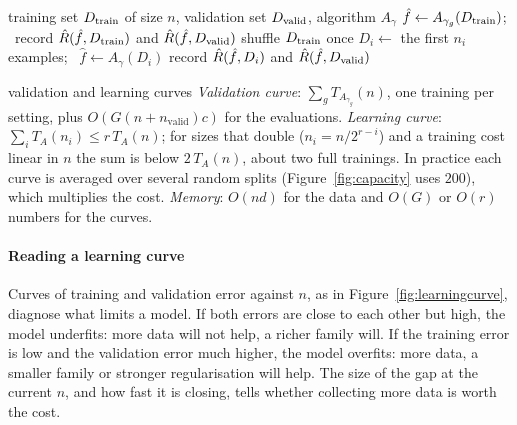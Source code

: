 \documentclass[11pt]{article}
\begin{document}
\begin{algorithm}[htbp]\small
\caption{Validation curve and learning curve}
\label{alg:curves}
\begin{algorithmic}[1]
\Require training set $D_{\mathrm{train}}$ of size $n$, validation set $D_{\mathrm{valid}}$, algorithm $A_\gamma$
    \State $\hat f \gets A_{\gamma_g}(D_{\mathrm{train}})$; \ record $\hat R(\hat f, D_{\mathrm{train}})$ and $\hat R(\hat f, D_{\mathrm{valid}})$
  \EndFor
\EndFunction
{}
  \State shuffle $D_{\mathrm{train}}$ once 
    \State $D_i \gets$ the first $n_i$ examples; \ $\hat f \gets A_\gamma(D_i)$
    \State record $\hat R(\hat f, D_i)$ and $\hat R(\hat f, D_{\mathrm{valid}})$
  \EndFor
\EndFunction
\end{algorithmic}
\end{algorithm}

\begin{runtime}{validation and learning curves}
\emph{Validation curve}: $\sum_g T_{A_{\gamma_g}}(n)$, one training per setting, plus $O(G(n + n_{\mathrm{valid}})c)$
for the evaluations. \emph{Learning curve}: $\sum_i T_A(n_i) \le r\,T_A(n)$; for sizes that double ($n_i = n/2^{r-i}$)
and a training cost linear in $n$ the sum is below $2\,T_A(n)$, about two full trainings. In practice each curve is
averaged over several random splits (Figure~\ref{fig:capacity} uses $200$), which multiplies the cost. \emph{Memory}:
$O(nd)$ for the data and $O(G)$ or $O(r)$ numbers for the curves.
\end{runtime}

\paragraph{Reading a learning curve} Curves of training and validation error against $n$, as in
Figure~\ref{fig:learningcurve}, diagnose what limits a model. If both errors are close to each other but high, the
model underfits: more data will not help, a richer family will. If the training error is low and the validation error
much higher, the model overfits: more data, a smaller family or stronger regularisation will help. The size of the gap
at the current $n$, and how fast it is closing, tells whether collecting more data is worth the cost.
\end{document}
